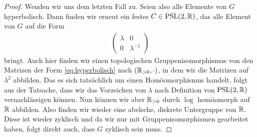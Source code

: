 \begin{proof}
  Wenden wir uns dem letzten Fall zu. Seien also alle Elemente von $G$
  hyperbolisch. Dann finden wir erneut ein festes $C \in \operatorname{PSL}(2, \mathbb{R})$,
  das alle Element von $G$ auf die Form
  \begin{align}
    \label{eq:hyperbolisch}
  \begin{pmatrix}
    \lambda & 0 \\
    0 & \lambda^{-1}
  \end{pmatrix}
  \end{align}
  bringt. Auch hier finden wir einen topologischen
  Gruppenisomorphismus von den Matrizen
  der Form \eqref{eq:hyperbolisch} nach $(\mathbb{R}_{> 0}, \cdot)$, in
  dem wir die Matrizen auf $\lambda^2$ abbilden. Das es sich
  tatsächlich um einen Homöomorphismus handelt, folgt aus der
  Tatsache, dass wir das Vorzeichen von $\lambda$ nach Definition von
  $\operatorname{PSL}(2, \mathbb{R})$ vernachlässigen können. Nun können wir aber $\mathbb{R}_{> 0}$
  durch $\log$ homöomorph auf $\mathbb{R}$ abbilden. Also finden wir wieder
  eine abelsche, diskrete Untergruppe von $\mathbb{R}$. Diese ist wieder
  zyklisch und da wir nur mit Gruppenisomorphismen gearbeitet haben, folgt
  direkt auch, dass $G$ zyklisch sein muss.
\end{proof}

